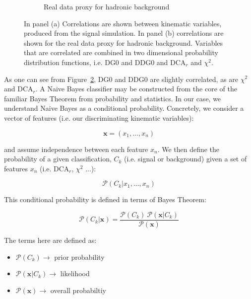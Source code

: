 \begin{figure}[H]
\begin{subfigure}[t]{0.5\textwidth}
		\caption{
      Real data proxy for hadronic background
    }
		\label{fig:corr_mat_bkg}
	\end{subfigure}
	\caption{ 
    In panel (a) Correlations are shown between kinematic variables, produced
    from the signal simulation. In panel (b) correlations are shown for the real
    data proxy for hadronic background. Variables that are correlated are
    combined in two dimensional probability distribution functions, i.e. DG0 and
    DDG0 and DCA$_r$ and $\chi^2$.
    }
	\label{fig:kinematic_var_correlations}
\end{figure}

As one can see from Figure~\ref{fig:kinematic_var_correlations}, DG0 and DDG0
are slightly correlated, as are $\chi^2$ and DCA$_r$. A Naive Bayes classifier
may be constructed from the core of the familiar Bayes Theorem from probability
and statistics. In our case, we understand Naive Bayes as a conditional
probability. Concretely, we consider a vector of features (i.e.  our
discriminating kinematic variables):

\begin{equation}
	\label{eq:feature_vector}
\mathbf{x} = (x_1, \dots, x_n)
\end{equation}

{\noindent}and assume independence between each feature $x_n$. We then define the
probability of a given classification, $C_k$ (i.e. signal or background) given a
set of features $x_n$ (i.e. DCA$_r$, $\chi^2$ ...):

\begin{equation}
	\label{eq:cond_probabilty}
  \mathcal{P}(C_k \vert x_1, \dots, x_n)
\end{equation}

{\noindent}This conditional probability is defined in terms of Bayes Theorem:

\begin{equation}
	\label{eq:bayes_theorm}
  \mathcal{P}(C_k \vert \mathbf{x}) = \frac{\mathcal{P}(C_k) \
  \mathcal{P}(\mathbf{x} \vert C_k)}{\mathcal{P}(\mathbf{x})}
\end{equation}

{\noindent}The terms here are defined as:
\begin{itemize}
  \item $\mathcal{P}(C_k)\rightarrow$ prior probability
	\item $\mathcal{P}(\mathbf{x} \vert C_k)\rightarrow$ likelihood
	\item $\mathcal{P}(\mathbf{x})\rightarrow$ overall probabiltiy
\end{itemize}

